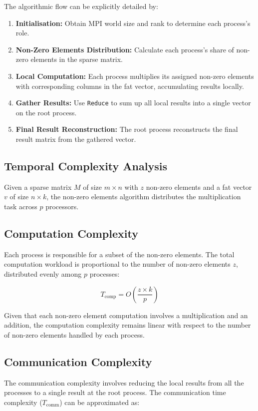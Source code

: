 \documentclass[12pt,oneside]{book} %
\begin{document}
The algorithmic flow can be explicitly detailed by:
\begin{enumerate}
    \item \textbf{Initialisation:} Obtain MPI world size and rank to determine each process's role.
    \item \textbf{Non-Zero Elements Distribution:} Calculate each process's share of non-zero elements in the sparse matrix.
    \item \textbf{Local Computation:} Each process multiplies its assigned non-zero elements with corresponding columns in the fat vector, accumulating results locally.
    \item \textbf{Gather Results:} Use \texttt{Reduce} to sum up all local results into a single vector on the root process.
    \item \textbf{Final Result Reconstruction:} The root process reconstructs the final result matrix from the gathered vector.
\end{enumerate}

\subsection{Temporal Complexity Analysis}
Given a sparse matrix $M$ of size $m \times n$ with $z$ non-zero elements and a
fat vector $v$ of size $n \times k$, the non-zero elements algorithm
distributes the multiplication task across $p$ processors.

\subsection{Computation Complexity}
Each process is responsible for a subset of the non-zero elements. The total
computation workload is proportional to the number of non-zero elements \(z\),
distributed evenly among \(p\) processes:

\begin{equation}
    T_{\text{comp}} = O\left(\frac{z \times k}{p}\right)
\end{equation}

Given that each non-zero element computation involves a multiplication and an
addition, the computation complexity remains linear with respect to the number
of non-zero elements handled by each process.

\subsection{Communication Complexity}
The communication complexity involves reducing the local results from all the
processes to a single result at the root process. The communication time
complexity (\(T_{\text{comm}}\)) can be approximated as:
\end{document}
